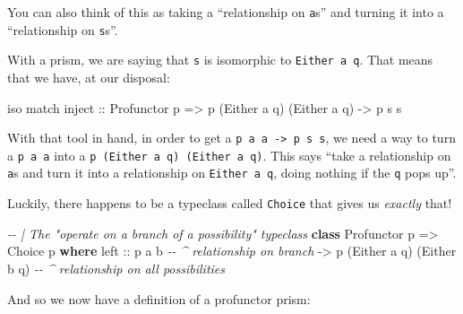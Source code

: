 \documentclass[]{article}
\newenvironment{Shaded}{}{}
\newcommand{\CommentTok}[1]{\textcolor[rgb]{0.38,0.63,0.69}{\textit{#1}}}
\newcommand{\DataTypeTok}[1]{\textcolor[rgb]{0.56,0.13,0.00}{#1}}
\newcommand{\KeywordTok}[1]{\textcolor[rgb]{0.00,0.44,0.13}{\textbf{#1}}}
\newcommand{\NormalTok}[1]{#1}
\newcommand{\OtherTok}[1]{\textcolor[rgb]{0.00,0.44,0.13}{#1}}
\begin{document}
You can also think of this as taking a ``relationship on \texttt{a}s'' and
turning it into a ``relationship on \texttt{s}s''.

With a prism, we are saying that \texttt{s} is isomorphic to
\texttt{Either\ a\ q}. That means that we have, at our disposal:

\begin{Shaded}
\begin{Highlighting}[]
\NormalTok{iso match inject}
\OtherTok{    ::} \DataTypeTok{Profunctor}\NormalTok{ p}
    \OtherTok{=>}\NormalTok{ p (}\DataTypeTok{Either}\NormalTok{ a q) (}\DataTypeTok{Either}\NormalTok{ a q)}
    \OtherTok{{-}>}\NormalTok{ p s s}
\end{Highlighting}
\end{Shaded}

With that tool in hand, in order to get a
\texttt{p\ a\ a\ -\textgreater{}\ p\ s\ s}, we need a way to turn a
\texttt{p\ a\ a} into a \texttt{p\ (Either\ a\ q)\ (Either\ a\ q)}. This says
``take a relationship on \texttt{a}s and turn it into a relationship on
\texttt{Either\ a\ q}, doing nothing if the \texttt{q} pops up''.

Luckily, there happens to be a typeclass called \texttt{Choice} that gives us
\emph{exactly} that!

\begin{Shaded}
\begin{Highlighting}[]
\CommentTok{{-}{-} | The "operate on a branch of a possibility" typeclass}
\KeywordTok{class} \DataTypeTok{Profunctor}\NormalTok{ p }\OtherTok{=>} \DataTypeTok{Choice}\NormalTok{ p }\KeywordTok{where}
\NormalTok{    left\textquotesingle{}}
\OtherTok{        ::}\NormalTok{ p a b                        }\CommentTok{{-}{-} \^{} relationship on branch}
        \OtherTok{{-}>}\NormalTok{ p (}\DataTypeTok{Either}\NormalTok{ a q) (}\DataTypeTok{Either}\NormalTok{ b q)  }\CommentTok{{-}{-} \^{} relationship on all possibilities}
\end{Highlighting}
\end{Shaded}

And so we now have a definition of a profunctor prism:
\end{document}
